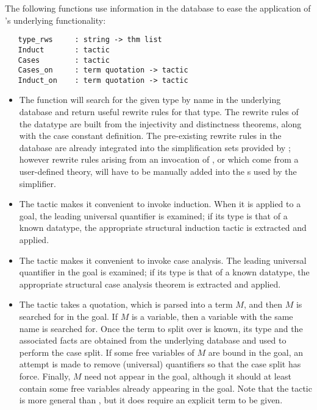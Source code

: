 The following functions use information in the database to ease the
application of \HOL's underlying functionality:

\begin{verbatim}
   type_rws     : string -> thm list
   Induct       : tactic
   Cases        : tactic
   Cases_on     : term quotation -> tactic
   Induct_on    : term quotation -> tactic
\end{verbatim}

\begin{itemize}

\item
The function  will search for the given type
by name in the underlying database and return useful
rewrite rules for that type. The rewrite rules of the
datatype are built from the injectivity and distinctness theorems, along
with the case constant definition. The pre-existing rewrite rules in the
database are already integrated into the simplification sets provided
by \bossLib; however rewrite rules arising from an invocation of
, or which come from a user-defined theory, will have
to be manually added into the \simpset{}s used by the simplifier.

\item
The  tactic makes it convenient to invoke
induction. When it is applied to a goal, the leading universal
quantifier is examined; if its type is that of a known datatype, the
appropriate structural induction tactic is extracted and applied.

\item
The  tactic makes it convenient to invoke case
analysis. The leading universal quantifier in the goal is examined; if
its type is that of a known datatype, the appropriate structural
case analysis theorem is extracted and applied.

\item The  tactic takes a quotation, which is
parsed into a term $M$, and then $M$ is searched for in the goal. If $M$
is a variable, then a variable with the same name is searched for. Once
the term to split over is known, its type and the associated facts are
obtained from the underlying database and used to perform the case
split. If some free variables of $M$ are bound in the goal, an attempt
is made to remove (universal) quantifiers so that the case split has
force. Finally, $M$ need not appear in the goal, although it should at
least contain some free variables already appearing in the goal. Note
that the  tactic is more general than , but
it does require an explicit term to be given.


\end{itemize}
